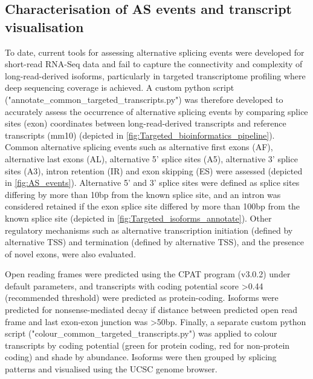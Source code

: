 \subsection{Characterisation of AS events and transcript visualisation}
To date, current tools for assessing alternative splicing events were developed for short-read RNA-Seq data and fail to capture the connectivity and complexity of long-read-derived isoforms, particularly in targeted transcriptome profiling where deep sequencing coverage is achieved. A custom python script ("annotate\_common\_targeted\_transcripts.py") was therefore developed to accurately assess the occurrence of alternative splicing events by comparing splice sites (exon) coordinates between long-read-derived transcripts and reference transcripts (mm10) (depicted in \cref{fig:Targeted_bioinformatics_pipeline}). Common alternative splicing events such as alternative first exons (AF), alternative last exons (AL), alternative 5' splice sites (A5), alternative 3' splice sites (A3), intron retention (IR) and exon skipping (ES) were assessed (depicted in \cref{fig:AS_events}). Alternative 5' and 3' splice sites were defined as splice sites differing by more than 10bp from the known splice site, and an intron was considered retained if the exon splice site differed by more than 100bp from the known splice site (depicted in \cref{fig:Targeted_isoforms_annotate}). Other regulatory mechanisms such as alternative transcription initiation (defined by alternative TSS) and termination (defined by alternative TSS), and the presence of novel exons, were also evaluated. 

Open reading frames were predicted using the CPAT program (v3.0.2) under default parameters, and transcripts with coding potential score >0.44 (recommended threshold) were predicted as protein-coding. Isoforms were predicted for nonsense-mediated decay if distance between predicted open read frame and last exon-exon junction was >50bp. Finally, a separate custom python script ("colour\_common\_targeted\_transcripts.py") was applied to colour transcripts by coding potential (green for protein coding, red for non-protein coding) and shade by abundance. Isoforms were then grouped by splicing patterns and visualised using the UCSC genome browser. 

